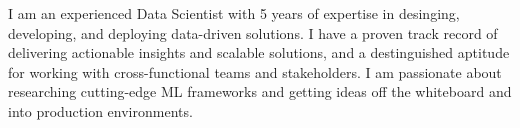 
\begin{cvparagraph}


I am an experienced Data Scientist with 5 years of expertise in desinging, developing, and deploying data-driven solutions. I have a proven track record of delivering actionable insights and scalable solutions, and a destinguished aptitude for working with cross-functional teams and stakeholders. I am passionate about researching cutting-edge ML frameworks and getting ideas off the whiteboard and into production environments.

\vspace{-2mm}
\end{cvparagraph}
